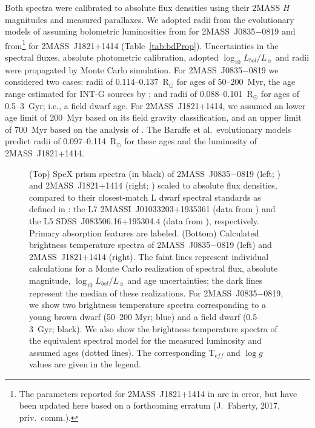 \documentclass[twocolumn]{aastex6}
\newcommand{\lbol}{$\log_{10}{L_{bol}/L_{\sun}}$}
\newcommand{\teff}{T$_{eff}$}
\newcommand{\logg}{$\log{g}$}
\newcommand{\sha}{2MASS~J0835$-$0819}
\newcommand{\shb}{2MASS~J1821+1414}
\begin{document}
Both spectra were calibrated to absolute flux densities using their 2MASS $H$ magnitudes and measured parallaxes. We adopted radii from the evolutionary models of \citet{2003A&A...402..701B} assuming bolometric luminosities from \citet{2015ApJ...810..158F} for {\sha} and from\footnote{The parameters reported for {\shb} in \citet{2016ApJS..225...10F} are in error, but have been updated here based on a forthcoming erratum (J.\ Faherty, 2017, priv.\ comm.).} \citet{2016ApJS..225...10F} for {\shb} (Table~\ref{tab:bdProp}). Uncertainties in the spectral fluxes, absolute photometric calibration, adopted {\lbol} and radii were propagated by Monte Carlo simulation.  For {\sha} we considered two cases: radii of 0.114--0.137~R$_{\odot}$ for ages of 50--200~Myr, the age range estimated for INT-G sources by \citet{2013ApJ...772...79A}; and radii of 0.088--0.101~R$_{\odot}$ for ages of 0.5--3~Gyr; i.e., a field dwarf age.
For {\shb}, we assumed an lower age limit of 200~Myr based on its field gravity classification, and an upper limit of 700~Myr based on the analysis of \citet{2016MNRAS.455..357S}. The Baraffe et al.\ evolutionary models predict radii of 0.097--0.114~R$_{\odot}$ for these ages and the luminosity of {\shb}.  

\begin{figure}
\centering
	\caption{(Top) SpeX prism spectra (in black) of {\sha} (left; \citealt{2010ApJ...710.1142B}) and {\shb} (right; \citealt{2008ApJ...686..528L}) scaled to absolute flux densities, compared to their closest-match L dwarf spectral standards as defined in \citet[in magenta]{2010ApJS..190..100K}: the L7 2MASSI~J01033203+1935361 (data from \citealt{2014ApJ...794..143B}) and the L5 SDSS~J083506.16+195304.4 (data from \citealt{2006AJ....131.2722C}), respectively. 
	Primary absorption features are labeled.
	(Bottom) Calculated brightness temperature spectra of {\sha} (left) and {\shb} (right).
	The faint lines represent individual calculations for a Monte Carlo realization of spectral flux, absolute magnitude, {\lbol} and age uncertainties; the dark lines represent the median of these realizations.
	For {\sha}, we show two  brightness temperature spectra corresponding to a young brown dwarf (50--200 Myr; blue) and a field dwarf (0.5--3~Gyr; black).
	We also show the brightness temperature spectra of the equivalent spectral model for the measured luminosity and assumed ages (dotted lines).
	The corresponding {\teff} and {\logg} values are given in the legend.}
	\label{fig:tbright}
	\vspace{0.1in}
\end{figure} 
\end{document}
